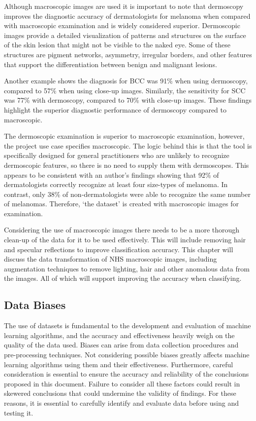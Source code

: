 Although macroscopic images are used it is important to note that dermoscopy improves the diagnostic accuracy of dermatologists for melanoma when compared with macroscopic examination\cite{Wolner2017} and is widely considered superior\cite{Thiers2009}. Dermoscopic images provide a detailed visualization of patterns and structures on the surface of the skin lesion that might not be visible to the naked eye\cite{Thiers2009}. Some of these structures are pigment networks, asymmetry, irregular borders, and other features that support the differentiation between benign and malignant lesions\cite{Thiers2009}.

Another example shows the diagnosis for BCC was 91\% when using dermoscopy, compared to 57\% when using close-up images\cite{Dascalu2022}. Similarly, the sensitivity for SCC was 77\% with dermoscopy, compared to 70\% with close-up images\cite{Dascalu2022}. These findings highlight the superior diagnostic performance of dermoscopy compared to macroscopic.

The dermoscopic examination is superior to macroscopic examination, however, the project use case specifies macroscopic. The logic behind this is that the tool is specifically designed for general practitioners who are unlikely to recognize dermoscopic features, so there is no need to supply them with dermoscopes. This appears to be consistent with an author's findings showing that 92\% of dermatologists correctly recognize at least four size-types of melanoma. In contrast, only 38\% of non-dermatologists were able to recognize the same number of melanomas\cite{Tae2019}. Therefore, `the dataset' is created with macroscopic images for examination.

Considering the use of macroscopic images there needs to be a more thorough clean-up of the data for it to be used effectively. This will include removing hair and specular reflections to improve classification accuracy. This chapter will discuss the data transformation of NHS macroscopic images, including augmentation techniques to remove lighting, hair and other anomalous data from the images. All of which will support improving the accuracy when classifying.

\subsection{Data Biases}
The use of datasets is fundamental to the development and evaluation of machine learning algorithms, and the accuracy and effectiveness heavily weigh on the quality of the data used. Biases can arise from data collection procedures and pre-processing techniques. Not considering possible biases greatly affects machine learning algorithms using them and their effectiveness. Furthermore, careful consideration is essential to ensure the accuracy and reliability of the conclusions proposed in this document. Failure to consider all these factors could result in skewered conclusions that could undermine the validity of findings. For these reasons, it is essential to carefully identify and evaluate data before using and testing it.

